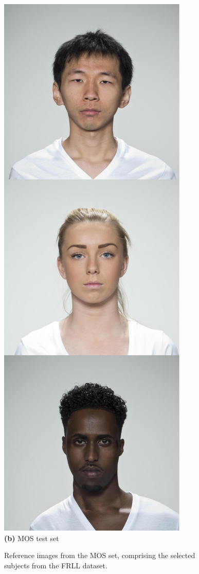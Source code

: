 \begin{figure}
\begin{minipage}[t]{0.19\textwidth}
        \includegraphics[width=\textwidth]{images/mos_test_set.pdf}\\
        \textbf{(b)} MOS test set %
    \end{minipage}
    \caption{Reference images from the MOS set, comprising the selected subjects from the FRLL dataset.}\label{fig:mos_set}
\end{figure}

